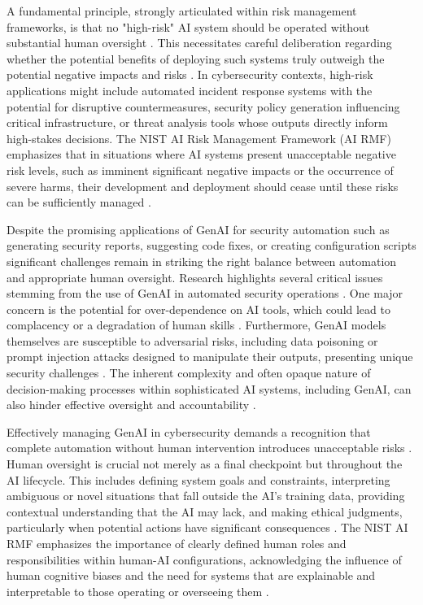 A fundamental principle, strongly articulated within risk management frameworks, is that no "high-risk" AI system should be operated without substantial human oversight \cite[p.7]{tabassi_artificial_2023}. This necessitates careful deliberation regarding whether the potential benefits of deploying such systems truly outweigh the potential negative impacts and risks \cite{tabassi_artificial_2023}. In cybersecurity contexts, high-risk applications might include automated incident response systems with the potential for disruptive countermeasures, security policy generation influencing critical infrastructure, or threat analysis tools whose outputs directly inform high-stakes decisions. The NIST AI Risk Management Framework (AI RMF) emphasizes that in situations where AI systems present unacceptable negative risk levels, such as imminent significant negative impacts or the occurrence of severe harms, their development and deployment should cease until these risks can be sufficiently managed \cite{tabassi_artificial_2023}.

Despite the promising applications of GenAI for security automation such as generating security reports, suggesting code fixes, or creating configuration scripts significant challenges remain in striking the right balance between automation and appropriate human oversight. Research highlights several critical issues stemming from the use of GenAI in automated security operations \cite{patel_generative_2025}. One major concern is the potential for over-dependence on AI tools, which could lead to complacency or a degradation of human skills \cite{patel_generative_2025}. Furthermore, GenAI models themselves are susceptible to adversarial risks, including data poisoning or prompt injection attacks designed to manipulate their outputs, presenting unique security challenges \cite{patel_generative_2025}. The inherent complexity and often opaque nature of decision-making processes within sophisticated AI systems, including GenAI, can also hinder effective oversight and accountability \cite{tabassi_artificial_2023} \cite{patel_generative_2025}.

Effectively managing GenAI in cybersecurity demands a recognition that complete automation without human intervention introduces unacceptable risks \cite{patel_generative_2025}. Human oversight is crucial not merely as a final checkpoint but throughout the AI lifecycle. This includes defining system goals and constraints, interpreting ambiguous or novel situations that fall outside the AI's training data, providing contextual understanding that the AI may lack, and making ethical judgments, particularly when potential actions have significant consequences \cite{tabassi_artificial_2023}. The NIST AI RMF emphasizes the importance of clearly defined human roles and responsibilities within human-AI configurations, acknowledging the influence of human cognitive biases and the need for systems that are explainable and interpretable to those operating or overseeing them \cite{tabassi_artificial_2023}.

